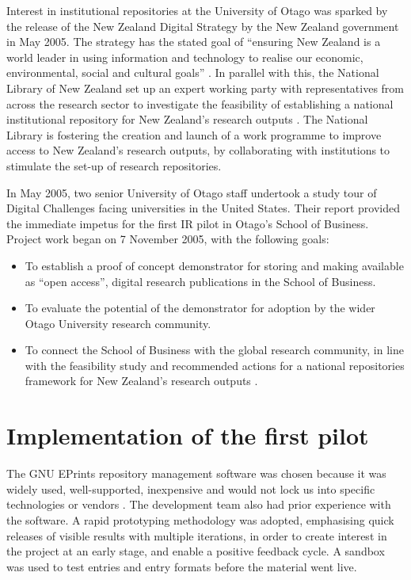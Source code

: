 \documentclass[12pt,pdftex,a4paper,titlepage]{article}
\begin{document}
Interest in institutional repositories at the University of Otago was sparked by the release of the New Zealand Digital Strategy by the New Zealand government in May 2005. The strategy has the stated goal of ``ensuring New Zealand is a world leader in using information and technology to realise our economic, environmental, social and cultural goals'' \cite{NZG-2005-digital_strategy}. In parallel with this, the National Library of New Zealand set up an expert working party with representatives from across the research sector to investigate the feasibility of establishing a national institutional repository for New Zealand's research outputs \cite{Rank-J-2005-feasibility}. The National Library is fostering the creation and launch of a work programme to improve access to New Zealand's research outputs, by collaborating with institutions to stimulate the set-up of research repositories.

In May 2005, two senior University of Otago staff undertook a study tour of Digital Challenges facing universities in the United States. Their report provided the immediate impetus for the first IR pilot in Otago's School of Business. Project work began on 7 November 2005, with the following goals:
 
\begin{itemize}

	\item To establish a proof of concept demonstrator for storing and making available as ``open access'', digital research publications in the School of Business.

	\item To evaluate the potential of the demonstrator for adoption by the wider Otago University research community.

	\item To connect the School of Business with the global research community, in line with the feasibility study and recommended actions for a national repositories framework for New Zealand's research outputs \cite{Rank-J-2005-feasibility}.

\end{itemize}


\section{Implementation of the first pilot}

The GNU EPrints repository management software was chosen because it was widely used, well-supported, inexpensive and would not lock us into specific technologies or vendors \cite{Sale-A-2005-NZIRW}. The development team also had prior experience with the software. A rapid prototyping methodology was adopted, emphasising quick releases of visible results with multiple iterations, in order to create interest in the project at an early stage, and enable a positive feedback cycle. A sandbox was used to test entries and entry formats before the material went live.
\end{document}
